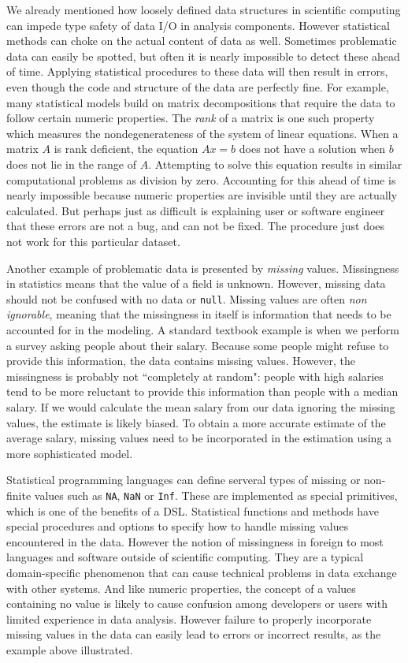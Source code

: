 We already mentioned how loosely defined data structures in scientific computing can impede type safety of data I/O in analysis components. However statistical methods can choke on the actual content of data as well. Sometimes problematic data can easily be spotted, but often it is nearly impossible to detect these ahead of time. Applying statistical procedures to these data will then result in errors, even though the code and structure of the data are perfectly fine. For example, many statistical models build on matrix decompositions that require the data to follow certain numeric properties. The \emph{rank} of a matrix is one such property which measures the nondegenerateness of the system of linear equations. When a matrix $A$ is rank deficient, the equation $Ax=b$ does not have a solution when $b$ does not lie in the range of $A$. Attempting to solve this equation results in similar computational problems as division by zero. Accounting for this ahead of time is nearly impossible because numeric properties are invisible until they are actually calculated. But perhaps just as difficult is explaining user or software engineer that these errors are not a bug, and can not be fixed. The procedure just does not work for this particular dataset.

Another example of problematic data is presented by \emph{missing} values. Missingness in statistics means that the value of a field is unknown. However, missing data should not be confused with no data or \texttt{null}. Missing values are often \emph{non ignorable}, meaning that the missingness in itself is information that needs to be accounted for in the modeling. A standard textbook example is when we perform a survey asking people about their salary. Because some people might refuse to provide this information, the data contains missing values. However, the missingness is probably not ``completely at random": people with high salaries tend to be more reluctant to provide this information than people with a median salary. If we would calculate the mean salary from our data ignoring the missing values, the estimate is likely biased. To obtain a more accurate estimate of the average salary, missing values need to be incorporated in the estimation using a more sophisticated model. 

Statistical programming languages can define serveral types of missing or non-finite values such as \texttt{NA}, \texttt{NaN} or \texttt{Inf}. These are implemented as special primitives, which is one of the benefits of a DSL. Statistical functions and methods have special procedures and options to specify how to handle missing values encountered in the data. However the notion of missingness in foreign to most languages and software outside of scientific computing. They are a typical domain-specific phenomenon that can cause technical problems in data exchange with other systems. And like numeric properties, the concept of a values containing no value is likely to cause confusion among developers or users with limited experience in data analysis. However failure to properly incorporate missing values in the data can easily lead to errors or incorrect results, as the example above illustrated.

